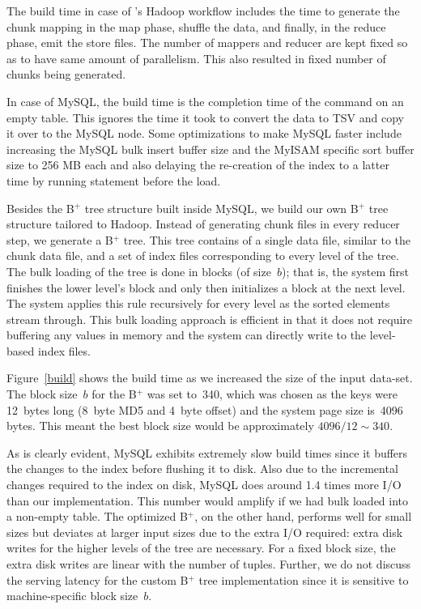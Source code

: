 The build time in case of \projectname's Hadoop workflow includes the
time to generate the chunk mapping in the map phase, shuffle the data,
and finally, in the reduce phase, emit the store files. The number of
mappers and reducer are kept fixed so as to have same amount of
parallelism. This also resulted in fixed number of chunks being
generated.

In case of MySQL, the build time is the completion time of the
 command on an empty table. This ignores the 
time it took to convert the data to TSV and copy it over to the MySQL 
node. Some optimizations to make MySQL faster include increasing the 
MySQL bulk insert buffer size and the MyISAM specific sort buffer 
size to 256 MB each and also delaying the re-creation of the index 
to a latter time by running  statement 
before the load. 

Besides the B$^{+}$ tree structure built inside MySQL, we build our
own B$^{+}$ tree structure tailored to Hadoop. Instead of generating
chunk files in every reducer step, we generate a B$^{+}$ tree. This
tree contains of a single data file, similar to the chunk data file,
and a set of index files corresponding to every level of the tree. The
bulk loading of the tree is done in blocks (of size~$b$); that is, the
system first finishes the lower level's block and only then
initializes a block at the next level. The system applies this rule
recursively for every level as the sorted elements stream through.
This bulk loading approach is efficient in that it does not require
buffering any values in memory and the system can directly write to
the level-based index files. 

Figure~\ref{build} shows the build time as we increased the size of
the input data-set. The block size~$b$ for the B$^{+}$ was set to~340,
which was chosen as the keys were 12~bytes long (8~byte MD5 and 4~byte
offset) and the system page size is~4096 bytes. This meant the best
block size would be approximately $4096/12 \sim 340$. 

As is clearly evident, MySQL exhibits extremely slow build times since it buffers
the changes to the index before flushing it to disk. Also due to the
incremental changes required to the index on disk, MySQL does around
1.4 times more I/O than our implementation. This number would amplify 
if we had bulk loaded into a non-empty table. The optimized B$^{+}$, 
on the other hand, performs well for small sizes but deviates at larger 
input sizes due to the extra I/O required: extra disk writes for the 
higher levels of the tree are necessary. For a fixed block size, 
the extra disk writes are linear with the number of tuples. 
Further, we do not discuss the serving latency for the custom B$^{+}$ tree 
implementation since it is sensitive to machine-specific block size~$b$.

